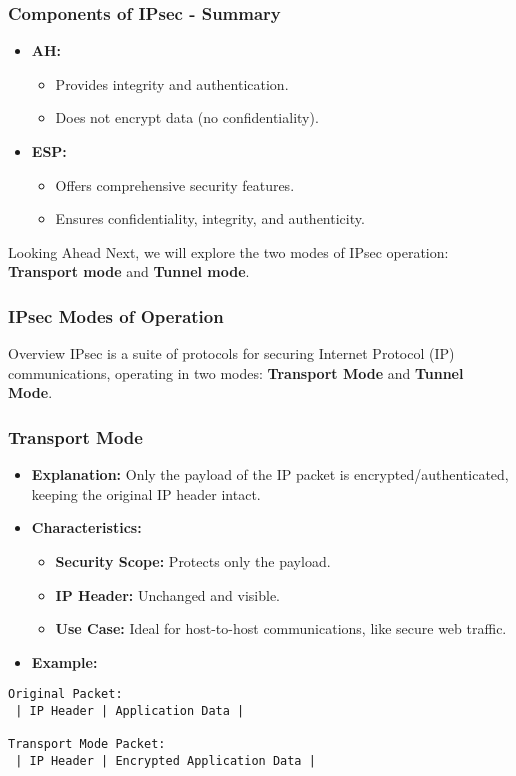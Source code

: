 \documentclass{beamer}
\begin{document}
\begin{frame}[fragile]
    \frametitle{Components of IPsec - Summary}
    \begin{itemize}
        \item \textbf{AH:} 
            \begin{itemize}
                \item Provides integrity and authentication.
                \item Does not encrypt data (no confidentiality).
            \end{itemize}
        \item \textbf{ESP:} 
            \begin{itemize}
                \item Offers comprehensive security features.
                \item Ensures confidentiality, integrity, and authenticity.
            \end{itemize}
    \end{itemize}
    \begin{block}{Looking Ahead}
        Next, we will explore the two modes of IPsec operation: \textbf{Transport mode} and \textbf{Tunnel mode}.
    \end{block}
\end{frame}

\begin{frame}[fragile]
    \frametitle{IPsec Modes of Operation}
    \begin{block}{Overview}
        IPsec is a suite of protocols for securing Internet Protocol (IP) communications, operating in two modes: \textbf{Transport Mode} and \textbf{Tunnel Mode}.
    \end{block}
\end{frame}

\begin{frame}[fragile]
    \frametitle{Transport Mode}
    \begin{itemize}
        \item \textbf{Explanation:} Only the payload of the IP packet is encrypted/authenticated, keeping the original IP header intact. 
        \item \textbf{Characteristics:}
            \begin{itemize}
                \item \textbf{Security Scope:} Protects only the payload.
                \item \textbf{IP Header:} Unchanged and visible.
                \item \textbf{Use Case:} Ideal for host-to-host communications, like secure web traffic.
            \end{itemize}
        \item \textbf{Example:}
    \end{itemize}
    \begin{lstlisting}
Original Packet:
 | IP Header | Application Data |

Transport Mode Packet:
 | IP Header | Encrypted Application Data |
    \end{lstlisting}
\end{frame}
\end{document}
